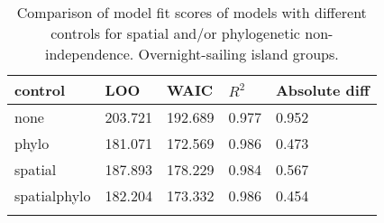 \begin{longtable}{p{2cm}p{2cm}p{2cm}p{2cm}p{2cm}}
  \toprule
control & LOO & WAIC & $R^2$ & Absolute diff \\ 
  \midrule
none & 203.721 & 192.689 & 0.977 & 0.952 \\ 
  phylo & 181.071 & 172.569 & 0.986 & 0.473 \\ 
  spatial & 187.893 & 178.229 & 0.984 & 0.567 \\ 
  spatialphylo & 182.204 & 173.332 & 0.986 & 0.454 \\ 
   \bottomrule
\caption{Comparison of model fit scores of models with different controls for spatial and/or phylogenetic non-independence. Overnight-sailing island groups.} 
\label{model_fit_score_table_SBZR}
\end{longtable}

